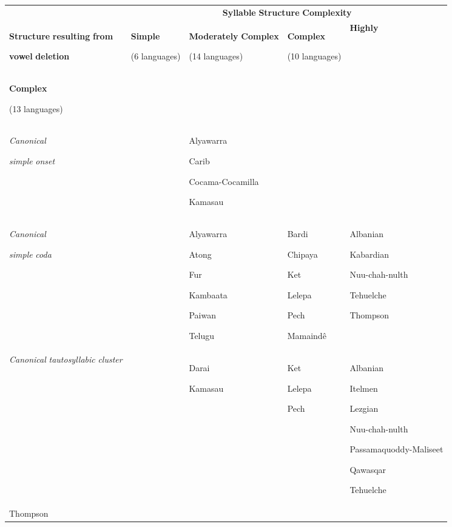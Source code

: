 \begin{table}
\begin{tabularx}{\textwidth}{XXXXX}
\lsptoprule
 & \multicolumn{4}{c}{ \textbf{Syllable} \textbf{Structure} \textbf{Complexity}}\\
\textbf{Structure} \textbf{resulting} \textbf{from} 

\textbf{vowel} \textbf{deletion} & { \textbf{Simple}}

 (6 languages) &  \textbf{Moderately} \textbf{Complex}

 (14 languages) &  \textbf{Complex}

 (10 languages) &  \textbf{Highly} \\
\textbf{Complex}

 (13 languages)\\
\textit{Canonical} 

\textit{simple} \textit{onset} &  & Alyawarra

Carib

Cocama-Cocamilla

Kamasau &  & \\
\textit{Canonical} 

\textit{simple} \textit{coda} &  & Alyawarra

Atong

Fur

Kambaata

Paiwan

Telugu & Bardi

Chipaya

Ket

Lelepa

Pech

Mamaindê & Albanian

Kabardian

Nuu-chah-nulth

Tehuelche

Thompson\\
\textit{Canonical} \textit{tautosyllabic} \textit{cluster} &  & Darai

Kamasau & Ket

Lelepa

Pech & Albanian

Itelmen

Lezgian

Nuu-chah-nulth

Passamaquoddy-Maliseet

Qawasqar

Tehuelche\\
Thompson


\end{tabularx}
\end{table}
